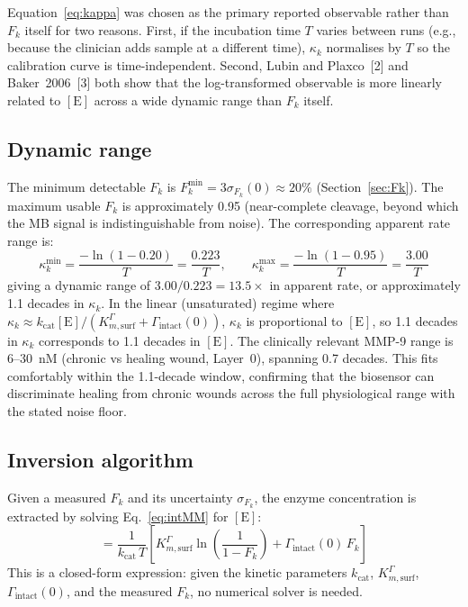 \documentclass[10pt,a4paper]{article}
\numberwithin{equation}{section}
\newcommand{\cit}[1]{[#1]}
\newcommand{\Gtot}{\Gamma_{\text{intact}}}
\newcommand{\kcat}{k_{\text{cat}}}
\newcommand{\Km}{K_{m,\text{surf}}^{\Gamma}}
\newcommand{\kk}{\kappa_k}
\newcommand{\Fk}{F_k}
\begin{document}
Equation~\eqref{eq:kappa} was chosen as the primary reported observable
rather than $\Fk$ itself for two reasons. First, if the incubation time
$T$ varies between runs (e.g., because the clinician adds sample at a
different time), $\kk$ normalises by $T$ so the calibration curve is
time-independent. Second, Lubin and Plaxco~\cit{2} and Baker~2006~\cit{3}
both show that the log-transformed observable is more linearly related to
$[\text{E}]$ across a wide dynamic range than $\Fk$ itself.

\subsection{Dynamic range}

The minimum detectable $\Fk$ is $\Fk^\text{min} = 3\sigma_{\Fk}(0)
\approx 20\%$ (Section~\ref{sec:Fk}). The maximum usable $\Fk$ is
approximately 0.95 (near-complete cleavage, beyond which the MB signal
is indistinguishable from noise). The corresponding apparent rate range is:
\begin{equation}
  \kk^\text{min} = \frac{-\ln(1-0.20)}{T} = \frac{0.223}{T},
  \qquad
  \kk^\text{max} = \frac{-\ln(1-0.95)}{T} = \frac{3.00}{T}
  \label{eq:dynrange}
\end{equation}
giving a dynamic range of $3.00/0.223 = 13.5\times$ in apparent rate, or
approximately 1.1 decades in $\kk$. In the linear (unsaturated) regime
where $\kk \approx \kcat[\text{E}]/(\Km + \Gtot(0))$, $\kk$ is proportional
to $[\text{E}]$, so 1.1 decades in $\kk$ corresponds to 1.1 decades in
$[\text{E}]$. The clinically relevant MMP-9 range is 6--30~nM
(chronic vs healing wound, Layer~0), spanning 0.7 decades. This fits
comfortably within the 1.1-decade window, confirming that the biosensor
can discriminate healing from chronic wounds across the full physiological
range with the stated noise floor.

\subsection{Inversion algorithm}

Given a measured $\Fk$ and its uncertainty $\sigma_{\Fk}$, the enzyme
concentration is extracted by solving Eq.~\eqref{eq:intMM} for $[\text{E}]$:
\begin{equation}
  [\text{E}] = \frac{1}{\kcat\,T}\left[\Km\ln\!\left(\frac{1}{1-\Fk}\right)
  + \Gtot(0)\,\Fk\right]
  \label{eq:inversion}
\end{equation}
This is a closed-form expression: given the kinetic parameters $\kcat$,
$\Km$, $\Gtot(0)$, and the measured $\Fk$, no numerical solver is needed.
\end{document}
